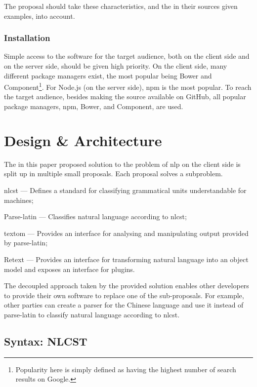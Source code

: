 The proposal should take these characteristics, and the in their sources
  given examples, into account.

\subsection{Installation}\label{installation}

Simple access to the software for the target audience, both on the client
  side and on the server side, should be given high priority.
On the client side, many different package managers exist, the most
  popular being Bower and Component\footnote{Popularity here is simply
    defined as having the highest number of search results on Google.}.
For Node.js (on the server side), \gls{npm} is the most popular.
To reach the target audience, besides making the source available on GitHub,
  all popular package managers, \gls{npm}, Bower, and Component, are used.

\chapter{Design \& Architecture}\label{design}

The in this paper proposed solution to the problem of \gls{nlp} on the
client side is split up in multiple small proposals. Each proposal
solves a subproblem.

\begin{aenumerate}
\item
  \gls{nlcst} --- Defines a standard for classifying grammatical units
  understandable for machines;
\item
  Parse-latin --- Classifies natural language according to \gls{nlcst};
\item
  \gls{textom} --- Provides an interface for analysing and manipulating
  output provided by parse-latin;
\item
  Retext --- Provides an interface for transforming natural language
  into an object model and exposes an interface for plugins.
\end{aenumerate}

The decoupled approach taken by the provided solution enables other
developers to provide their own software to replace one of the
sub-proposals. For example, other parties can create a parser for the
Chinese language and use it instead of parse-latin to classify natural
language according to \gls{nlcst}.

\section{Syntax: NLCST}\label{syntax}

